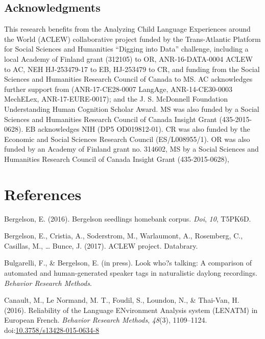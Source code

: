 \documentclass[english,floatsintext,man]{apa6}
\begin{document}
\subsection{Acknowledgments}\label{acknowledgments}

This research benefits from the Analyzing Child Language Experiences
around the World (ACLEW) collaborative project funded by the
Trans-Atlantic Platform for Social Sciences and Humanities
\enquote{Digging into Data} challenge, including a local Academy of
Finland grant (312105) to OR, ANR-16-DATA-0004 ACLEW to AC, NEH
HJ-253479-17 to EB, HJ-253479 to CR, and funding from the Social
Sciences and Humanities Research Council of Canada to MS. AC
acknowledges further support from (ANR-17-CE28-0007 LangAge,
ANR-14-CE30-0003 MechELex, ANR-17-EURE-0017); and the J. S. McDonnell
Foundation Understanding Human Cognition Scholar Award. MS was also
funded by a Social Sciences and Humanities Research Council of Canada
Insight Grant (435-2015-0628). EB acknowledges NIH (DP5 OD019812-01). CR
was also funded by the Economic and Social Sciences Research Council
(ES/L008955/1). OR was also funded by an Academy of Finland grant no.
314602, MS by a Social Sciences and Humanities Research Council of
Canada Insight Grant (435-2015-0628),

\newpage

\section{References}\label{references}

\setlength{\parindent}{-0.5in} \setlength{\leftskip}{0.5in}

\hypertarget{refs}{}
\hypertarget{ref-bergelson2016bergelson}{}
Bergelson, E. (2016). Bergelson seedlings homebank corpus. \emph{Doi},
\emph{10}, T5PK6D.

\hypertarget{ref-bergelson2017}{}
Bergelson, E., Cristia, A., Soderstrom, M., Warlaumont, A., Rosemberg,
C., Casillas, M., \ldots{} Bunce, J. (2017). ACLEW project. Databrary.

\hypertarget{ref-bulgarelli2019}{}
Bulgarelli, F., \& Bergelson, E. (in press). Look who?s talking: A
comparison of automated and human-generated speaker tags in naturalistic
daylong recordings. \emph{Behavior Research Methods}.

\hypertarget{ref-Canault2016}{}
Canault, M., Le Normand, M. T., Foudil, S., Loundon, N., \& Thai-Van, H.
(2016). Reliability of the Language ENvironment Analysis system (LENATM)
in European French. \emph{Behavior Research Methods}, \emph{48}(3),
1109--1124.
doi:\href{https://doi.org/10.3758/s13428-015-0634-8}{10.3758/s13428-015-0634-8}
\end{document}

